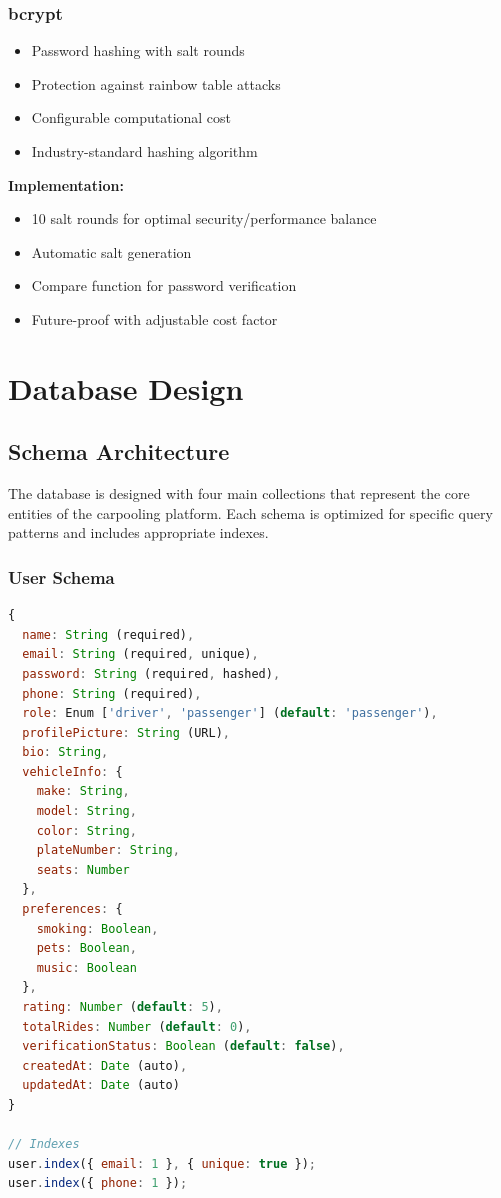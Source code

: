 \documentclass[12pt,a4paper]{article}
\begin{document}
\subsubsection{bcrypt}
\begin{itemize}
    \item Password hashing with salt rounds
    \item Protection against rainbow table attacks
    \item Configurable computational cost
    \item Industry-standard hashing algorithm
\end{itemize}

\textbf{Implementation:}
\begin{itemize}
    \item 10 salt rounds for optimal security/performance balance
    \item Automatic salt generation
    \item Compare function for password verification
    \item Future-proof with adjustable cost factor
\end{itemize}

\newpage

\section{Database Design}

\subsection{Schema Architecture}

The database is designed with four main collections that represent the core entities of the carpooling platform. Each schema is optimized for specific query patterns and includes appropriate indexes.

\subsubsection{User Schema}
\begin{lstlisting}[language=JavaScript, caption=User Model Structure]
{
  name: String (required),
  email: String (required, unique),
  password: String (required, hashed),
  phone: String (required),
  role: Enum ['driver', 'passenger'] (default: 'passenger'),
  profilePicture: String (URL),
  bio: String,
  vehicleInfo: {
    make: String,
    model: String,
    color: String,
    plateNumber: String,
    seats: Number
  },
  preferences: {
    smoking: Boolean,
    pets: Boolean,
    music: Boolean
  },
  rating: Number (default: 5),
  totalRides: Number (default: 0),
  verificationStatus: Boolean (default: false),
  createdAt: Date (auto),
  updatedAt: Date (auto)
}

// Indexes
user.index({ email: 1 }, { unique: true });
user.index({ phone: 1 });
\end{lstlisting}
\end{document}
